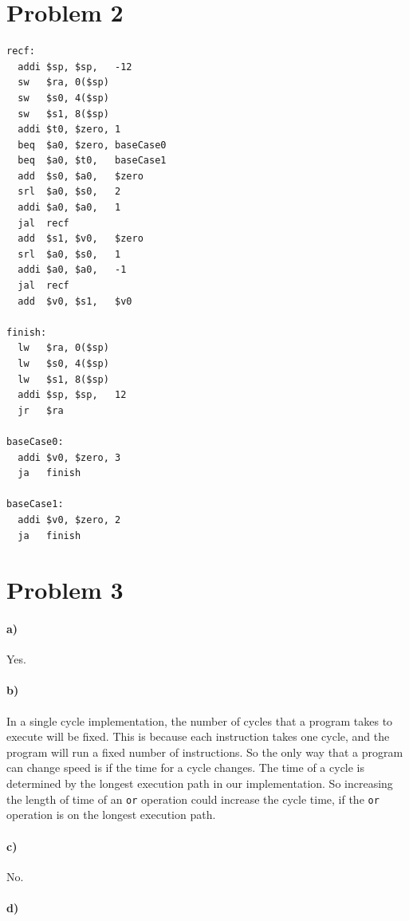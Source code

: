 \documentclass[12pt]{article}
\begin{document}
\section*{Problem 2}

\begin{verbatim}
recf:
  addi $sp, $sp,   -12
  sw   $ra, 0($sp)
  sw   $s0, 4($sp)
  sw   $s1, 8($sp)
  addi $t0, $zero, 1
  beq  $a0, $zero, baseCase0
  beq  $a0, $t0,   baseCase1
  add  $s0, $a0,   $zero
  srl  $a0, $s0,   2
  addi $a0, $a0,   1
  jal  recf
  add  $s1, $v0,   $zero
  srl  $a0, $s0,   1
  addi $a0, $a0,   -1
  jal  recf
  add  $v0, $s1,   $v0

finish:
  lw   $ra, 0($sp)
  lw   $s0, 4($sp)
  lw   $s1, 8($sp)
  addi $sp, $sp,   12
  jr   $ra

baseCase0:
  addi $v0, $zero, 3
  ja   finish

baseCase1:
  addi $v0, $zero, 2
  ja   finish
\end{verbatim}

\section*{Problem 3}

\paragraph{a)}

Yes.

\paragraph{b)}

In a single cycle implementation, the number of cycles that a program takes to execute will be fixed. This is because each instruction takes one cycle,
and the program will run a fixed number of instructions. So the only way that a program can change speed is if the time for a cycle changes. The time
of a cycle is determined by the longest execution path in our implementation. So increasing the length of time of an \texttt{or} operation could increase
the cycle time, if the \texttt{or} operation is on the longest execution path.

\paragraph{c)}

No.

\paragraph{d)}
\end{document}
